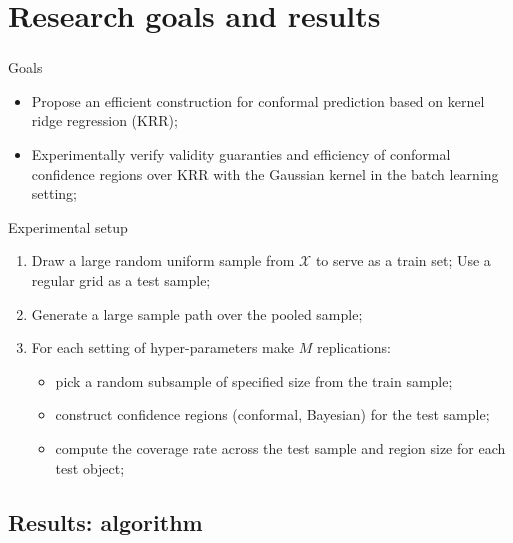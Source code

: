 \documentclass[t]{beamer}  %
\newcommand{\Xcal}{\mathcal{X}}
\begin{document}


\section{Research goals and results} %
\label{sec:research_goals_and_results}

\begin{frame}[c, shrink=10]\frametitle{\insertsection}
  \begin{block}{Goals}
    \begin{itemize}
      \item Propose an efficient construction for conformal prediction based on
      kernel ridge regression (KRR);
      \item Experimentally verify validity guaranties and efficiency of conformal
      confidence regions over KRR with the Gaussian kernel in the batch learning
      setting;
    \end{itemize}
  \end{block}

  \begin{block}{Experimental setup}
    \begin{enumerate}
      \item Draw a large random uniform sample from $\Xcal$ to serve as a train set;
        Use a regular grid as a test sample;
      \item Generate a large sample path over the pooled sample;
      \item For each setting of hyper-parameters make $M$ replications: \begin{itemize}
        \item pick a random subsample of specified size from the train sample;
        \item construct confidence regions (conformal, Bayesian) for the test sample;
        \item compute the coverage rate across the test sample and region size for each test object;
      \end{itemize}
    \end{enumerate}
  \end{block}
\end{frame}

\subsection{Results: algorithm} %
\label{sub:results_algorithm}
\end{document}
